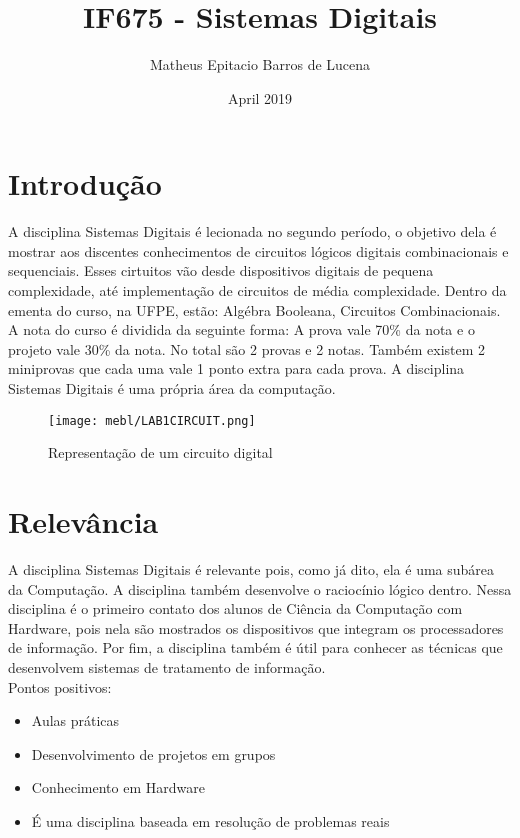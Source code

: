 \documentclass[10pt]{article}
\title{IF675 - Sistemas Digitais}
\author{Matheus Epitacio Barros de Lucena}
\date{April 2019}
\begin{document}
\maketitle

\section{Introdução}
A disciplina Sistemas Digitais é lecionada no segundo período, o objetivo dela é mostrar aos discentes conhecimentos de circuitos lógicos digitais combinacionais e sequenciais. Esses cirtuitos vão desde dispositivos digitais de pequena complexidade, até implementação de circuitos de média complexidade. Dentro da ementa do curso, na UFPE, estão: Algébra Booleana, Circuitos Combinacionais. A nota do curso é dividida da seguinte forma: A prova vale 70\% da nota e o projeto vale 30\% da nota. No total são 2 provas e 2 notas. Também existem 2 miniprovas que cada uma vale 1 ponto extra para cada prova. A disciplina Sistemas Digitais é uma própria área da computação.   %

\begin{figure}[h]
    \centering
\texttt{[image: mebl/LAB1CIRCUIT.png]}
    \label{fig:my_label}
    \caption{Representação de um circuito digital \cite{imagem}}
    
    
\end{figure}
\section{Relevância}
A disciplina Sistemas Digitais é relevante pois, como já dito, ela é uma subárea da Computação. A disciplina também desenvolve o raciocínio lógico dentro. Nessa disciplina é o primeiro contato dos alunos de Ciência da Computação com Hardware, pois nela são mostrados os dispositivos que integram os processadores de informação. Por fim, a disciplina também é útil para conhecer as técnicas que desenvolvem sistemas de tratamento de informação.\\


Pontos positivos:
\begin{itemize}
    \item Aulas práticas
    \item Desenvolvimento de projetos em grupos
    \item Conhecimento em Hardware
    \item É uma disciplina baseada em resolução de problemas reais
\end{itemize}
\end{document}
